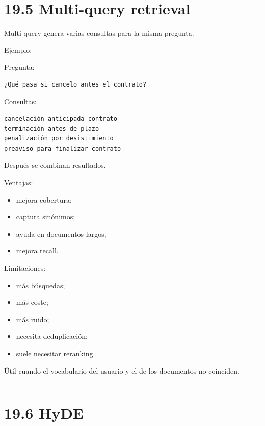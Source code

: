 \section{19.5 Multi-query retrieval}\label{multi-query-retrieval-1}

Multi-query genera varias consultas para la misma pregunta.

Ejemplo:

Pregunta:

\begin{lstlisting}
¿Qué pasa si cancelo antes el contrato?
\end{lstlisting}

Consultas:

\begin{lstlisting}
cancelación anticipada contrato
terminación antes de plazo
penalización por desistimiento
preaviso para finalizar contrato
\end{lstlisting}

Después se combinan resultados.

Ventajas:

\begin{itemize}
\tightlist
\item
  mejora cobertura;
\item
  captura sinónimos;
\item
  ayuda en documentos largos;
\item
  mejora recall.
\end{itemize}

Limitaciones:

\begin{itemize}
\tightlist
\item
  más búsquedas;
\item
  más coste;
\item
  más ruido;
\item
  necesita deduplicación;
\item
  suele necesitar reranking.
\end{itemize}

Útil cuando el vocabulario del usuario y el de los documentos no
coinciden.

\begin{center}\rule{0.5\linewidth}{0.5pt}\end{center}

\section{19.6 HyDE}\label{hyde-1}

